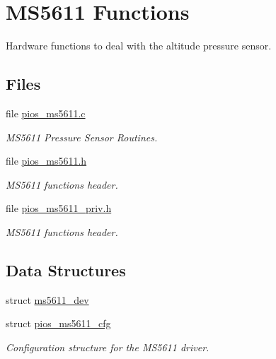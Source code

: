 \hypertarget{group___p_i_o_s___m_s5611}{\section{M\-S5611 Functions}
\label{group___p_i_o_s___m_s5611}
}


Hardware functions to deal with the altitude pressure sensor.  


\subsection*{Files}
\begin{DoxyCompactItemize}
\item 
file \hyperlink{pios__ms5611_8c}{pios\-\_\-ms5611.\-c}
\begin{DoxyCompactList}\small\item\em M\-S5611 Pressure Sensor Routines. \end{DoxyCompactList}\item 
file \hyperlink{pios__ms5611_8h}{pios\-\_\-ms5611.\-h}
\begin{DoxyCompactList}\small\item\em M\-S5611 functions header. \end{DoxyCompactList}\item 
file \hyperlink{pios__ms5611__priv_8h}{pios\-\_\-ms5611\-\_\-priv.\-h}
\begin{DoxyCompactList}\small\item\em M\-S5611 functions header. \end{DoxyCompactList}\end{DoxyCompactItemize}
\subsection*{Data Structures}
\begin{DoxyCompactItemize}
\item 
struct \hyperlink{structms5611__dev}{ms5611\-\_\-dev}
\item 
struct \hyperlink{structpios__ms5611__cfg}{pios\-\_\-ms5611\-\_\-cfg}
\begin{DoxyCompactList}\small\item\em Configuration structure for the M\-S5611 driver. \end{DoxyCompactList}\end{DoxyCompactItemize}
